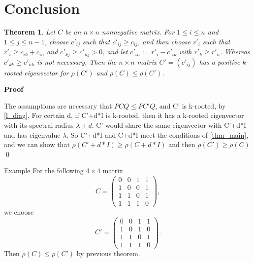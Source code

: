 \documentclass{article}
\begin{document}
\theoremstyle{plain}
\newtheorem{thm}{Theorem}[section]
\newtheorem{cor}[thm]{Corollary}
\newtheorem{lem}[thm]{Lemma}
\newtheorem{prop}[thm]{Proposition}
\newtheorem{remark}[thm]{Remark}
\newtheorem{pf}[thm]{Proof}

\newtheorem{eg}[thm]{Example}
\newtheorem{conj}[thm]{Conjecture}

\theoremstyle{definition}
\newtheorem{ex}[thm]{Exercise}
\newtheorem{defn}[thm]{Definition}
\newtheorem{prob}[thm]{Problem}
\newtheorem{exam}[thm]{Example}
\newtheorem{rem}[thm]{Remark}

\newtheorem{algo}[thm]{Algorithm}

\section{Conclusion}

\begin{thm}
Let $C$ be an $n\times n$ nonnegative matrix. For $1\leq i \leq n$ and $1\leq j\leq n-1$, choose $c'_{ij}$
such that $c'_{ij}\geq c_{ij}$, and then choose $r'_i$ such that $r'_i\geq c_{ik}+c_{in}$ and $c'_{kj}\geq c'_{nj}>0$, and 
let $c'_{in}:=r'_i-c'_{ik}$ with $r'_k \geq r'_n$. Whereas $c'_{kk}\geq c'_{nk}$ is not necessary. Then the $n\times n$ matrix $C'=(c'_{ij})$ has a positive $k$-rooted eigenvector for $\rho(C')$ and $\rho(C)\leq \rho(C')$. 
\end{thm}



{\bf Proof}

The assumptions are necessary that $PCQ \leq PC'Q$, and C' is k-rooted, by \ref{l_diag}, For certain d, if C'+d*I is k-rooted, then it has a k-rooted eigenvector with its spectral radius $\lambda + d$. C' would share the same eigenvector with C'+d*I and has eigenvalue $\lambda$. So C'+d*I and C+d*I meet the conditions of \ref{thm_main}, and we can show that $\rho(C' + d*I) \geq \rho(C +d*I)$ and then $\rho(C') \geq \rho(C)$  \qed



{Example}
For the following $4\times 4$ matrix
$$C=\begin{pmatrix}
0 & 0 & 1 & 1\\
1 & 0 & 0 & 1\\
1 & 1 & 0 & 1\\
1 & 1 & 1 & 0
\end{pmatrix},$$
we choose
$$C'=\begin{pmatrix}
0 & 0 & 1 & 1\\
1 & 0 & 1 &  0\\
1 & 1 & 0 & 1\\
1 & 1 & 1 & 0
\end{pmatrix}.$$
Then
$\rho(C)\leq \rho(C')$ by previous theorem.
\end{document}
